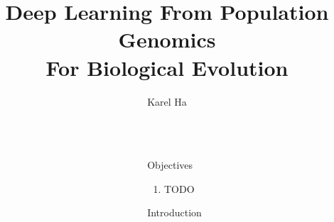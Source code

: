 \documentclass[final,hyperref={pdfpagelabels=false}]{beamer}
\title{\huge Deep Learning
From Population Genomics \\
For Biological Evolution} %
\author{Karel Ha} %
\institute{
Life Sciences -- Faculty of Natural Sciences\\
Imperial College London} %
\begin{document}

\begin{frame}[t] %

\begin{columns}[t] %

\begin{column}{.02\textwidth}\end{column} %

\begin{column}{.465\textwidth} %


\begin{block}{Objectives}

\begin{enumerate}
\item TODO
\end{enumerate}

\end{block}

            
\begin{block}{Introduction}


\end{block}
\end{column}
\end{columns}
\end{frame}
\end{document}
